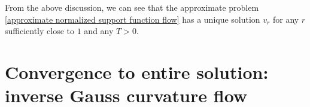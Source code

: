 \documentclass[reqno]{amsart}
\theoremstyle{remark}
\theoremstyle{definition}
\numberwithin{equation}{section}
\begin{document}

From the above discussion, we can see that the approximate problem \eqref{approximate normalized support function flow} has a unique solution $v_r$ for any $r$ sufficiently close to $1$ and any $T>0$.


\section{Convergence to entire solution: inverse Gauss curvature flow}\label{Convergence to entire solution: inverse Gauss curvature flow}
\end{document}

